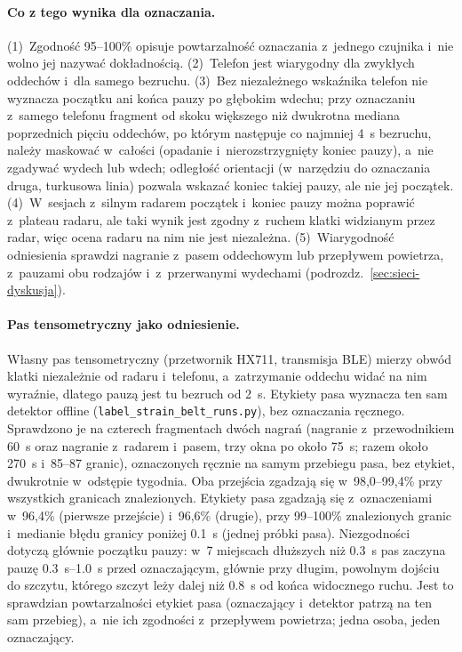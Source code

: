 \documentclass[12pt,a4paper,oneside]{report}
\begin{document}
\paragraph{Co z tego wynika dla oznaczania.} (1)~Zgodność 95--100\% opisuje powtarzalność oznaczania
z~jednego czujnika i~nie wolno jej nazywać dokładnością. (2)~Telefon jest wiarygodny dla zwykłych
oddechów i~dla samego bezruchu. (3)~Bez niezależnego wskaźnika telefon nie wyznacza początku ani końca
pauzy po głębokim wdechu; przy oznaczaniu z~samego telefonu fragment od skoku większego niż dwukrotna
mediana poprzednich pięciu oddechów, po którym następuje co najmniej \SI{4}{s} bezruchu, należy maskować
w~całości (opadanie i~nierozstrzygnięty koniec pauzy), a~nie zgadywać wydech lub wdech; odległość
orientacji (w~narzędziu do oznaczania druga, turkusowa linia) pozwala wskazać koniec takiej pauzy, ale nie
jej początek. (4)~W~sesjach
z~silnym radarem początek i~koniec pauzy można poprawić z~plateau radaru, ale taki wynik jest zgodny z~ruchem
klatki widzianym przez radar, więc ocena radaru na nim nie jest niezależna. (5)~Wiarygodność odniesienia
sprawdzi nagranie z~pasem oddechowym lub przepływem powietrza, z~pauzami obu rodzajów i~z~przerwanymi
wydechami (podrozdz.~\ref{sec:sieci-dyskusja}).

\paragraph{Pas tensometryczny jako odniesienie.} Własny pas tensometryczny (przetwornik HX711, transmisja
BLE) mierzy obwód klatki niezależnie od radaru i~telefonu, a~zatrzymanie oddechu widać na nim wyraźnie,
dlatego pauzą jest tu bezruch od \SI{2}{s}. Etykiety pasa wyznacza ten sam detektor offline
(\texttt{label\_strain\_belt\_runs.py}), bez oznaczania ręcznego. Sprawdzono je na czterech fragmentach
dwóch nagrań (nagranie z~przewodnikiem \SI{60}{s} oraz nagranie z~radarem i~pasem, trzy okna po około
\SI{75}{s}; razem około \SI{270}{s} i~85--87 granic), oznaczonych ręcznie na samym przebiegu pasa, bez etykiet,
dwukrotnie w~odstępie tygodnia. Oba przejścia zgadzają się w~98,0--99,4\% przy wszystkich granicach
znalezionych. Etykiety pasa zgadzają się z~oznaczeniami w~96,4\% (pierwsze przejście) i~96,6\% (drugie),
przy 99--100\% znalezionych granic i~medianie błędu granicy poniżej \SI{0.1}{s} (jednej próbki pasa).
Niezgodności dotyczą głównie początku pauzy: w~7 miejscach dłuższych niż \SI{0.3}{s} pas zaczyna pauzę
\SIrange{0.3}{1.0}{s} przed oznaczającym, głównie przy długim, powolnym dojściu do szczytu, którego szczyt
leży dalej niż \SI{0.8}{s} od końca widocznego ruchu. Jest to sprawdzian powtarzalności etykiet pasa (oznaczający i~detektor patrzą na ten sam
przebieg), a~nie ich zgodności z~przepływem powietrza; jedna osoba, jeden oznaczający.
\end{document}
